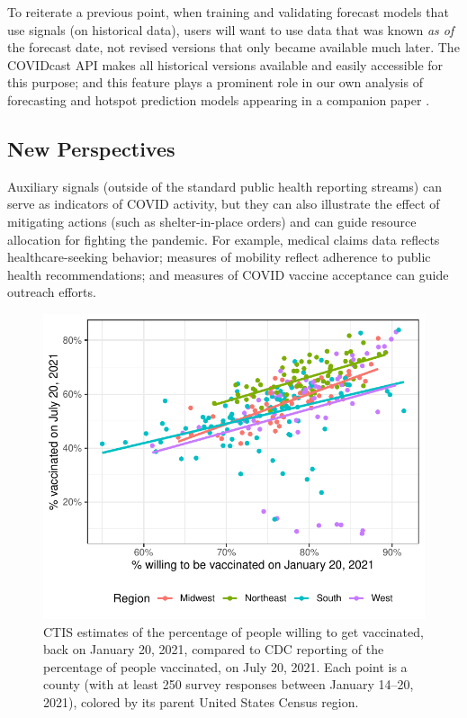 \documentclass[9pt,twocolumn,twoside,lineno]{pnas-new}
\begin{document}
To reiterate a previous point, when training and validating forecast models that
use signals (on historical data), users will want to use data that was known
\textit{as of} the forecast date, not revised versions that only became
available much later. The COVIDcast API makes all historical versions available
and easily accessible for this purpose; and this feature plays a prominent role
in our own analysis of forecasting and hotspot prediction models appearing in a
companion paper \cite{McDonald:2021}.%

\subsection{New Perspectives}

Auxiliary signals (outside of the standard public health reporting streams) can
serve as indicators of COVID activity, but they can also illustrate the effect
of mitigating actions (such as shelter-in-place orders) and can guide resource
allocation for fighting the pandemic. For example, medical claims data reflects
healthcare-seeking behavior; measures of mobility reflect adherence to public
health recommendations; and measures of COVID vaccine acceptance can guide
outreach efforts.

\begin{figure}
  \centering
  \includegraphics[width=\columnwidth]{fig/vaccine-intent-compare.pdf}
  \caption{CTIS estimates of the percentage of people willing to get
    vaccinated, back on January 20, 2021, compared to CDC reporting of the  
    percentage of people vaccinated, on July 20, 2021. Each point is a county
    (with at least 250 survey responses between January 14--20, 2021), colored
    by its parent United States Census region.}     
  \label{fig:vaccine-intent-compare}
\end{figure}
\end{document}
